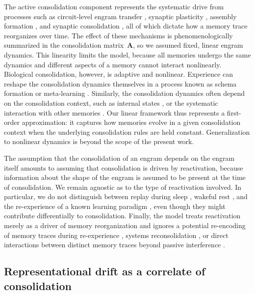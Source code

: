 The active consolidation component represents the systematic drive from processes such as circuit-level engram transfer \citep{McClelland1995,Remme2021,Bhasin2024}, synaptic plasticity \citep{Lee2023}, assembly formation \citep{Tome2024,Golbabaei2025}, and synaptic consolidation \citep{Fusi2005,Benna2016}, all of which dictate how a memory trace reorganizes over time. The effect of these mechanisms is phenomenologically summarized in the consolidation matrix~$\mathbf{A}$, so we assumed fixed, linear engram dynamics. This linearity limits the model, because all memories undergo the same dynamics and different aspects of a memory cannot interact nonlinearly. Biological consolidation, however, is adaptive and nonlinear. Experience can reshape the consolidation dynamics themselves in a process known as schema formation \citep{Tse2007} or meta-learning \citep{Wang2018,Zhou2025}. Similarly, the consolidation dynamics often depend on the consolidation context, such as internal states \citep{Chouhan2020}, or the systematic interaction with other memories \citep{McClelland1995,Schlichting2015}. Our linear framework thus represents a first-order approximation: it captures how memories evolve in a given consolidation context when the underlying consolidation rules are held constant. Generalization to nonlinear dynamics is beyond the scope of the present work. 

The assumption that the consolidation of an engram depends on the engram itself amounts to assuming that consolidation is driven by reactivation, because information about the shape of the engram is assumed to be present at the time of consolidation. We remain agnostic as to the type of reactivation involved. In particular, we do not distinguish between replay during sleep \citep{Diekelmann2010}, wakeful rest \citep{Wamsley2022}, and the re-experience of a known learning paradigm \citep{Himmer2019}, even though they might contribute differentially to consolidation. Finally, the model treats reactivation merely as a driver of memory reorganization and ignores a potential re-encoding of memory traces during re-experience \citep{Nadel1997}, systems reconsolidation \citep{Debiec2002}, or direct interactions between distinct memory traces beyond passive interference \citep{Schlichting2015}.

\subsection{Representational drift as a correlate of consolidation}

